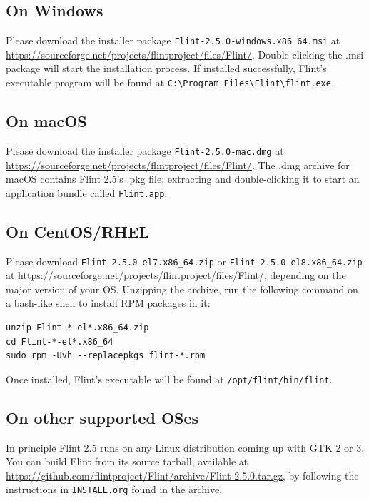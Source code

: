 \documentclass[a4paper,10pt]{report}
\begin{document}
\subsection{On Windows}
\label{sec:org09cdc57}
Please download the installer package \texttt{Flint-2.5.0-windows.x86\_64.msi} at
\url{https://sourceforge.net/projects/flintproject/files/Flint/}.
Double-clicking the .msi package will start the installation process.
If installed successfully, Flint's executable program will be found at
\texttt{C:\textbackslash{}Program Files\textbackslash{}Flint\textbackslash{}flint.exe}.

\subsection{On macOS}
\label{sec:org17664f9}
Please download the installer package \texttt{Flint-2.5.0-mac.dmg} at
\url{https://sourceforge.net/projects/flintproject/files/Flint/}.
The .dmg archive for macOS contains Flint 2.5's .pkg file; extracting and
double-clicking it to start an application bundle called
\texttt{Flint.app}.

\subsection{On CentOS/RHEL}
\label{sec:orgfb49896}
Please download \texttt{Flint-2.5.0-el7.x86\_64.zip} or \texttt{Flint-2.5.0-el8.x86\_64.zip}
at \url{https://sourceforge.net/projects/flintproject/files/Flint/}, depending
on the major version of your OS.
Unzipping the archive, run the following command on a bash-like shell to install
RPM packages in it:
\begin{verbatim}
unzip Flint-*-el*.x86_64.zip
cd Flint-*-el*.x86_64
sudo rpm -Uvh --replacepkgs flint-*.rpm
\end{verbatim}
Once installed, Flint's executable will be found at
\texttt{/opt/flint/bin/flint}.

\subsection{On other supported OSes}
\label{sec:org4af7ede}
In principle Flint 2.5 runs on any Linux distribution coming up with GTK 2 or 3.
You can build Flint from its source tarball, available at
\url{https://github.com/flintproject/Flint/archive/Flint-2.5.0.tar.gz},
by following the instructions in \texttt{INSTALL.org} found in the archive.
\end{document}
